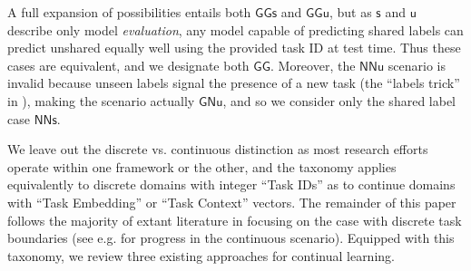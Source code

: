 \documentclass{article}
\newcommand{\casename}[1]{\ensuremath{\mathsf{#1}}\xspace}
\begin{document}
A full expansion of possibilities entails both \casename{GGs} and \casename{GGu}, but as \casename{s} and \casename{u} describe only model \emph{evaluation}, any model capable of predicting shared labels can predict unshared equally well using the provided task ID at test time. Thus these cases are equivalent, and we designate both \casename{GG}.
Moreover,
the \casename{NNu} scenario is invalid because unseen labels signal the presence of a new task (the ``labels trick'' in \cite{zeno2018task}), making the scenario actually \casename{GNu}, and so we consider only the shared label case \casename{NNs}.

We leave out the discrete vs. continuous distinction as most research efforts operate within one framework or the other, and the taxonomy applies equivalently to discrete domains with integer ``Task IDs'' as to continue domains with ``Task Embedding'' or ``Task Context'' vectors. The remainder of this paper follows the majority of extant literature in focusing on the case with discrete task boundaries (see e.g. \cite{ zeno2018task} for progress in the continuous scenario).
Equipped with this taxonomy, we review three existing approaches for continual learning.
\end{document}
